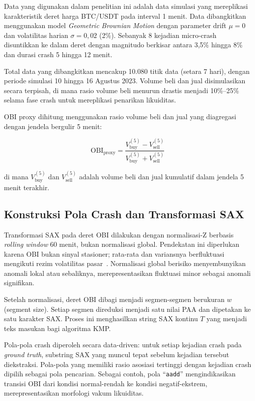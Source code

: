 \documentclass[conference]{IEEEtran}
\begin{document}
Data yang digunakan dalam penelitian ini adalah data simulasi yang mereplikasi karakteristik deret harga BTC/USDT pada interval 1 menit. Data dibangkitkan menggunakan model \textit{Geometric Brownian Motion} dengan parameter drift $\mu = 0$ dan volatilitas harian $\sigma = 0{,}02$ (2\%). Sebanyak 8 kejadian micro-crash disuntikkan ke dalam deret dengan magnitudo berkisar antara 3,5\% hingga 8\% dan durasi crash 5 hingga 12 menit.

Total data yang dibangkitkan mencakup 10.080 titik data (setara 7 hari), dengan periode simulasi 10 hingga 16 Agustus 2023. Volume beli dan jual disimulasikan secara terpisah, di mana rasio volume beli menurun drastis menjadi 10\%--25\% selama fase crash untuk mereplikasi penarikan likuiditas.

OBI proxy dihitung menggunakan rasio volume beli dan jual yang diagregasi dengan jendela bergulir 5 menit:

\begin{equation}
\text{OBI}_{\text{proxy}} = \frac{V_{\text{buy}}^{(5)} - V_{\text{sell}}^{(5)}}{V_{\text{buy}}^{(5)} + V_{\text{sell}}^{(5)}}
\label{eq:obi_proxy}
\end{equation}

\noindent di mana $V_{\text{buy}}^{(5)}$ dan $V_{\text{sell}}^{(5)}$ adalah volume beli dan jual kumulatif dalam jendela 5 menit terakhir.

\subsection{Konstruksi Pola Crash dan Transformasi SAX}

Transformasi SAX pada deret OBI dilakukan dengan normalisasi-Z berbasis \textit{rolling window} 60 menit, bukan normalisasi global. Pendekatan ini diperlukan karena OBI bukan sinyal stasioner; rata-rata dan variansnya berfluktuasi mengikuti rezim volatilitas pasar~\cite{park2019}. Normalisasi global berisiko menyembunyikan anomali lokal atau sebaliknya, merepresentasikan fluktuasi minor sebagai anomali signifikan.

Setelah normalisasi, deret OBI dibagi menjadi segmen-segmen berukuran $w$ (segment size). Setiap segmen direduksi menjadi satu nilai PAA dan dipetakan ke satu karakter SAX. Proses ini menghasilkan string SAX kontinu $T$ yang menjadi teks masukan bagi algoritma KMP.

Pola-pola crash diperoleh secara data-driven: untuk setiap kejadian crash pada \textit{ground truth}, substring SAX yang muncul tepat sebelum kejadian tersebut diekstraksi. Pola-pola yang memiliki rasio asosiasi tertinggi dengan kejadian crash dipilih sebagai pola pencarian. Sebagai contoh, pola ``\texttt{aadd}'' mengindikasikan transisi OBI dari kondisi normal-rendah ke kondisi negatif-ekstrem, merepresentasikan morfologi vakum likuiditas.
\end{document}
